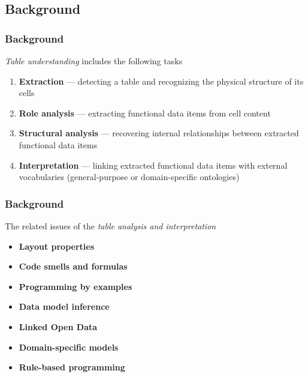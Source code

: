 \documentclass{beamer}
\begin{document}
\subsection{Background}

\begin{frame}
\frametitle{Background}
\emph{Table understanding} \cite{Hurst2001} includes the following tasks
\bigskip

\begin{enumerate}
	\item \textbf{Extraction} --- detecting a table and recognizing the physical structure of its cells
	\item \textbf{Role analysis} --- extracting functional data items from cell content
	\item \textbf{Structural analysis} --- recovering internal relationships between extracted functional data items
	\item \textbf{Interpretation} --- linking extracted functional data items with external vocabularies (general-purpose or domain-specific ontologies)
\end{enumerate}

\end{frame}

\begin{frame}
\frametitle{Background}
The related issues of the \emph{table analysis and interpretation}
\bigskip

{\footnotesize
\begin{itemize}
\item \textbf{Layout properties} \cite{Koci2017,Chen2017,Dou2018}
\item \textbf{Code smells and formulas} \cite{Hermans2015,Dou2017,Barowy2018,Koch2019}
\item \textbf{Programming by examples} \cite{Barowy2015,Singh2016,Jin2017}
\item \textbf{Data model inference} \cite{Amalfitano2015,Cunha2015,Cunha2016}
\item \textbf{Linked Open Data} \cite{Ritze2017,Zhang2017}
\item \textbf{Domain-specific models} \cite{Vos2017,Cao2017,Swidan2017}
\item \textbf{Rule-based programming} \cite{Yang2017,Shigarov2017,Yang2018}
\end{itemize}
}

\end{frame}
\end{document}
